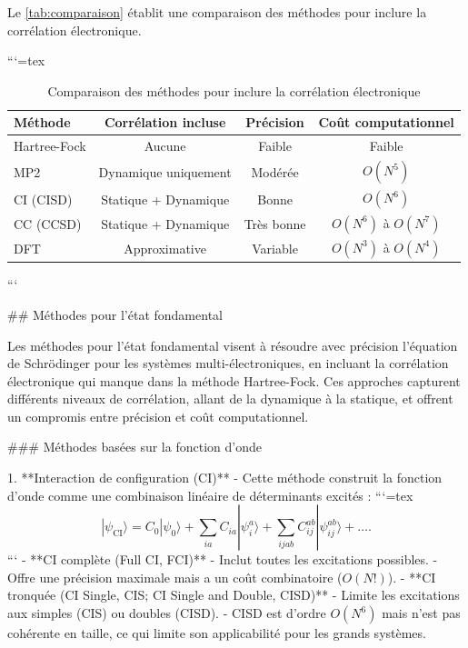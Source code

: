 \documentclass[12pt,a4paper]{report}
\begin{document}
\begin{markdown}
Le \autoref{tab:comparaison} établit une comparaison des méthodes pour inclure la corrélation électronique.

```{=tex}
\begin{table}[h!]
\centering
\caption{Comparaison des méthodes pour inclure la corrélation électronique}
\begin{tabular}{@{}lccc@{}}
\toprule
\textbf{Méthode}       & \textbf{Corrélation incluse} & \textbf{Précision}  & \textbf{Coût computationnel} \\ \midrule
Hartree-Fock           & Aucune                      & Faible              & Faible                       \\
MP2                    & Dynamique uniquement        & Modérée             & $O(N^5)$                     \\
CI (CISD)              & Statique + Dynamique        & Bonne               & $O(N^6)$                     \\
CC (CCSD)              & Statique + Dynamique        & Très bonne          & $O(N^6)$ à $O(N^7)$          \\
DFT                    & Approximative               & Variable            & $O(N^3)$ à $O(N^4)$          \\ \bottomrule
\end{tabular}
\label{tab:comparaison}
\end{table}
```

## Méthodes pour l'état fondamental

Les méthodes pour l'état fondamental visent à résoudre avec précision l'équation de Schrödinger pour les systèmes multi-électroniques, en incluant la corrélation électronique qui manque dans la méthode Hartree-Fock. Ces approches capturent différents niveaux de corrélation, allant de la dynamique à la statique, et offrent un compromis entre précision et coût computationnel.

### Méthodes basées sur la fonction d'onde

1. **Interaction de configuration (CI)**
   - Cette méthode construit la fonction d'onde comme une combinaison linéaire de déterminants excités :
```{=tex}
\[
|\psi_{\text{CI}}\rangle = C_0 |\psi_0\rangle + \sum_{ia} C_{ia} |\psi_i^a\rangle + \sum_{ijab} C_{ij}^{ab} |\psi_{ij}^{ab}\rangle + \dots .
\]
```
   - **CI complète (Full CI, FCI)**
     - Inclut toutes les excitations possibles.
     - Offre une précision maximale mais a un coût combinatoire (\(O(N!)\)).
   - **CI tronquée (CI Single, CIS; CI Single and Double, CISD)** 
     - Limite les excitations aux simples (CIS) ou doubles (CISD).
     - CISD est d'ordre \(O(N^6)\) mais n'est pas cohérente en taille, ce qui limite son applicabilité pour les grands systèmes.


\end{markdown}
\end{document}
